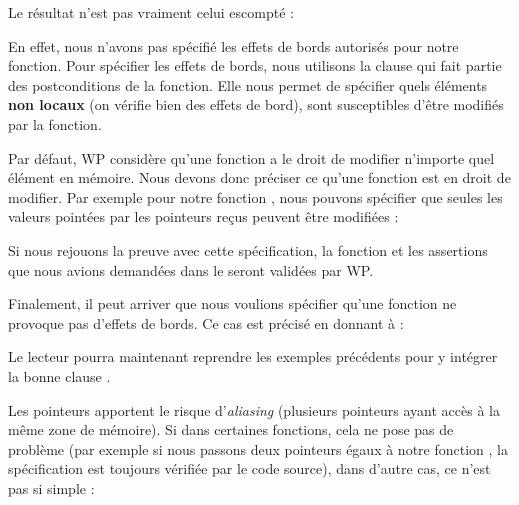 


Le résultat n'est pas vraiment celui escompté :





En effet, nous n'avons pas spécifié les effets de bords autorisés pour notre
fonction. Pour spécifier les effets de bords, nous utilisons la clause 
qui fait partie des postconditions de la fonction. Elle nous permet de spécifier 
quels éléments \textbf{non locaux} (on vérifie bien des effets de bord), sont 
susceptibles d'être modifiés par la fonction.



Par défaut, WP considère qu'une fonction a le droit de modifier n'importe quel
élément en mémoire. Nous devons donc préciser ce qu'une fonction est en droit 
de modifier. Par exemple pour notre fonction , nous pouvons
spécifier que seules les valeurs pointées par les pointeurs reçus peuvent être
modifiées :






Si nous rejouons la preuve avec cette spécification, la fonction et les 
assertions que nous avions demandées dans le  seront validées par WP.



Finalement, il peut arriver que nous voulions spécifier qu'une fonction ne 
provoque pas d'effets de bords. Ce cas est précisé en donnant 
à  :






Le lecteur pourra maintenant reprendre les exemples précédents pour y intégrer 
la bonne clause .





Les pointeurs apportent le risque d'\textit{aliasing} (plusieurs pointeurs ayant accès à
la même zone de mémoire). Si dans certaines fonctions, cela ne pose pas de 
problème (par exemple si nous passons deux pointeurs égaux
à notre fonction , la spécification est toujours vérifiée par le 
code source), dans d'autre cas, ce n'est pas si simple :



